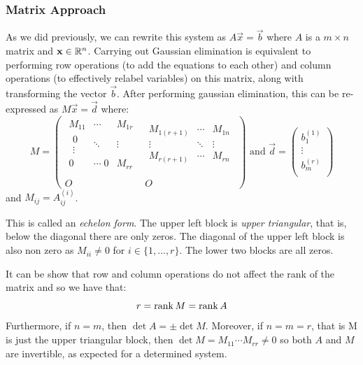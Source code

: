 \documentclass[../main.tex]{subfiles}
\begin{document}
\subsubsection{Matrix Approach}
As we did previously, we can rewrite this system as $A\vec{x} = \vec{b}$ where $A$ is a $m \times n$ matrix and $\mathbf{\bm{x}} \in \mathbb{R}^{n}$.
Carrying out Gaussian elimination is equivalent to performing row operations (to add the equations to each other) and column operations (to effectively relabel variables) on this matrix, along with transforming the vector $\vec{b}$.
After performing gaussian elimination, this can be re-expressed as $M\vec{x} = \vec{d}$ where:
\[
  M = \left(\begin{array}{c|c}
  \begin{matrix}
  M_{1 1} & \cdots & M_{1 r} \\
  \scriptstyle{\substack{0 \\\vdots}} & \ddots & \vdots \\
  \scriptstyle{0} & \cdots\;\scriptstyle{0} & M_{r r} \\
  \end{matrix} &\begin{matrix}
  M_{1 (r+1)} & \cdots & M_{1 n} \\
  \vdots & \ddots & \vdots \\
  M_{r (r+1)} & \cdots & M_{r n} \\
  \end{matrix} \\ \hline
  O & O
  \end{array}\right) \text{ and } \vec{d} = \begin{pmatrix}
  b^{(1)}_1 \\
  \vdots \\
  b^{(r)}_m \\
  \end{pmatrix}
\]
and $M_{i j} = A^{(i)}_{i j}$.

This is called an \textit{echelon form}.
The upper left block is \textit{upper triangular}, that is, below the diagonal there are only zeros.
The diagonal of the upper left block is also non zero as $M_{i i} \neq 0$ for $i \in \{1, \ldots, r\}$.
The lower two blocks are all zeros.

It can be show that row and column operations do not affect the rank of the matrix and so we have that:
\[
  r = \operatorname{rank} M = \operatorname{rank} A
\]
Furthermore, if $n = m$, then $\det A = \pm \det M$.
Moreover, if $n = m = r$, that is M is just the upper triangular block, then $\det M = M_{1 1} \cdots M_{r r} \neq 0$ so both $A$ and $M$ are invertible, as expected for a determined system.
\end{document}
